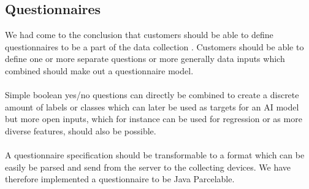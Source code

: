 \subsection{Questionnaires}
We had come to the conclusion that customers should be able to define questionnaires to be a part of the data collection . Customers should be able to define one or more separate questions or more generally data inputs which combined should make out a questionnaire model. 
\\\\
Simple boolean yes/no questions can directly be combined to create a discrete amount of labels or classes which can later be used as targets for an AI model but more open inputs, which for instance can be used for regression or as more diverse features, should also be possible. 
\\\\
A questionnaire specification should be transformable to a format which can be easily be parsed and send from the server to the collecting devices. We have therefore implemented a questionnaire to be Java Parcelable. 

